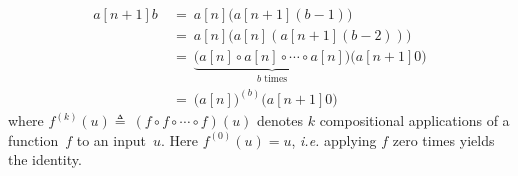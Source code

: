 \begin{equation*}
\begin{array}{lll}
a[n+1]b ~& = ~ a[n]\big(a[n+1](b-1)\big) \\
         & = ~ a[n]\big(a[n](a[n+1](b-2))\big) \\
         & = ~ \underbrace{\big( a[n]\circ a[n]\circ \cdots \circ a[n] \big)}_{b \text{ times}} \big(a[n+1]0\big) \\
         & = ~ \big(a[n]\big)^{(b)}\big(a[n+1]0\big)
\end{array}
\end{equation*}
where $f^{(k)}(u) \triangleq ~ (f\circ f\circ \cdots \circ f)(u)$ denotes $k$ compositional applications of a function~$f$ to an
input~$u$. Here $f^{(0)}(u) = u$, \emph{i.e.} applying $f$ zero times yields the identity.

